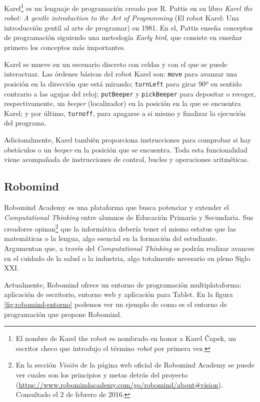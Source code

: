{{Karel\footnote{El nombre de Karel the robot es nombrado en honor a Karel Čapek, un escritor checo que introdujo el término \emph{robot} por primera vez.} es un lenguaje de programación creado por R. Pattis en su libro \emph{Karel the robot: A gentle introduction to the Art of Programming} (El robot Karel: Una introducción gentil al arte de programar) en 1981\cite{pattis1981karel}. En el, Pattis enseña conceptos de programación siguiendo una metodogía \emph{Early bird}\cite{early-bird}, que consiste en enseñar primero los conceptos más importantes.

Karel se mueve en un escenario discreto con celdas y con el que se puede interactuar. Las órdenes básicas del robot Karel son: \texttt{move} para avanzar una posición en la dirección que está mirando; \texttt{turnLeft} para girar 90º en sentido contrario a las agujas del reloj; \texttt{putBeeper} y \texttt{pickBeeper} para depositar o recoger, respectivamente, un \emph{beeper} (localizador) en la posición en la que se encuentra Karel; y por último, \texttt{turnoff}, para apagarse a si mismo y finalizar la ejecución del programa.

Adicionalmente, Karel también proporciona instrucciones para comprobar si hay obstáculos o un \emph{beeper} en la posición que se encuentra. Toda esta funcionalidad viene acompañada de instrucciones de control, bucles y operaciones aritméticas.




\subsection{Robomind}
\label{sec:robomind}


Robomind Academy\cite{robomind-web} es una plataforma que busca potenciar y extender el \emph{Computational Thinking} entre alumnos de Educación Primaria y Secundaria. Sus creadores opinan\footnote{En la sección \emph{Visión} de la página web oficial de Robomind Academy se puede ver cuales son los principios y metas detrás del proyecto (\url{https://www.robomindacademy.com/go/robomind/about#vision}). Consultado el 2 de febrero de 2016.} que la informática debería tener el mismo estatus que las matemáticas o la lengua, algo esencial en la formación del estudiante. Argumentan que, a través del \emph{Computational Thinking} se podrán realizar avances en el cuidado de la salud o la industria, algo totalmente necesario en pleno Siglo XXI. 


Actualmente, Robomind ofrece un entorno de programación multiplataforma: aplicación de escritorio, entorno web y aplicación para Tablet. En la figura \ref{fig:robomind-entorno} podemos ver un ejemplo de como es el entorno de programación que propone Robomind.


}}
